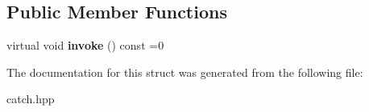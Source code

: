 \subsection*{Public Member Functions}
\begin{DoxyCompactItemize}
\item 
\mbox{\label{structCatch_1_1ITestCase_a678825e62e7c17297621cfeb65588c34}} 
virtual void {\bfseries invoke} () const =0
\end{DoxyCompactItemize}


The documentation for this struct was generated from the following file\+:\begin{DoxyCompactItemize}
\item 
catch.\+hpp\end{DoxyCompactItemize}
